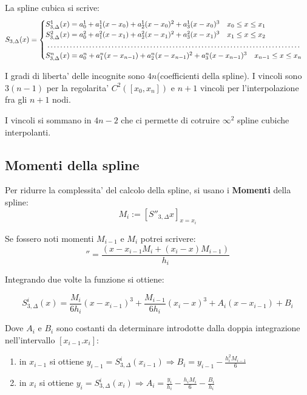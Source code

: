 La spline cubica si scrive:
\begin{equation}
  S_{3,\Delta}(x) =
  \begin{cases}
    S_{3, \Delta}^1(x) = a_0^1 + a_1^1(x - x_0) + a_2^1(x - x_0)^2 + a_3^1(x - x_0)^3 \quad x_0 \leq x \leq x_1 \\ 
    S_{3, \Delta}^2(x) = a_0^2 + a_1^2(x - x_1) + a_2^2(x - x_1)^2 + a_3^2(x - x_1)^3 \quad x_1 \leq x \leq x_2 \\ 
    \dotfill \\
    S_{3, \Delta}^n(x) = a_0^n + a_1^n(x - x_{n-1}) + a_2^n(x - x_{n-1})^2 + a_3^n(x - x_{n-1})^3 \quad x_{n-1} \leq x \leq x_n 
  \end{cases}
\end{equation}

I gradi di liberta' delle incognite sono $4n$(coefficienti della spline).
I vincoli sono $3(n-1)$ per la regolarita' $C^2([x_0, x_n])$ e $n+1$ vincoli per l'interpolazione fra gli $n+1$ nodi.

I vincoli si sommano in $4n -2$ che ci permette di cotruire $\infty^2$ spline cubiche interpolanti.

\subsection{Momenti della spline}
Per ridurre la complessita' del calcolo della spline, si usano i \textbf{Momenti} della spline:
\begin{equation}
  M_i := [S''_{3, \Delta}{x}]_{x=x_i} 
\end{equation}

Se fossero noti momenti $M_{i-1}$ e $M_i$ potrei scrivere:
\begin{equation}
  [S^i_{3, \Delta}{x}]'' = \frac{(x - x_{i-1} M_i + (x_i - x) M_{i-1})}{h_i}
\end{equation}

Integrando due volte la funzione si ottiene:


\begin{equation}
S^i_{3, \Delta}(x) = \frac{M_i}{6h_i}(x - x_{i-1})^3 + \frac{M_{i-1}}{6h_i}(x_i - x)^3 + A_i (x - x_{i-1}) + B_i 
\end{equation}

Dove $A_i$ e $B_i$ sono costanti da determinare introdotte dalla doppia integrazione nell'intervallo $[x_{i-1}. x_i]$:

\begin{enumerate}
  \item in $x_{i-1}$ si ottiene $y_{i-1} = S^i_{3, \Delta}(x_{i-1}) \Rightarrow B_i = y_{i-1} - \frac{h_i^2M_{i-1}}{6}$
  \item in $x_i$ si ottiene $y_i = S^i_{3, \Delta}(x_i) \Rightarrow A_i = \frac{y_i}{h_i} - \frac{h_iM_i}{6} - \frac{B_i}{h_i}$
\end{enumerate}



